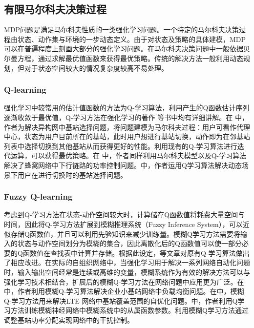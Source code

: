 ﻿\documentclass[11pt,draftclsnofoot,onecolumn,journal,letterpaper]{IEEEtran}
\begin{document}

\subsection{有限马尔科夫决策过程}
MDP问题是满足马尔科夫性质的一类强化学习问题。一个特定的马尔科夫决策过程由状态、动作集与环境的一步动态定义。由于对状态及策略的具体建模，MDP可以在普遍程度上刻画大部分的强化学习问题。在马尔科夫决策问题中一般依据贝尔曼方程，通过求解最优值函数来获得最优策略。传统的解决方法一般利用动态规划，但对于状态空间较大的情况复杂度较高不易处理。

\subsubsection{Q-learning}
强化学习中较常用的估计值函数的方法为Q-学习算法，利用产生的Q函数估计序列逐渐收敛于最优值，Q-学习方法在强化学习的著作
\cite{Sutton2016}等书中均有详细讲解。在\cite{Simsek2015} 中，作者为解决异构网中基站选择问题，将问题建模为马尔科夫过程：用户可看作代理中心，状态为用户目前所在的基站，此时用户想进行基站切换，动作即为在邻基站列表中选择切换到其他基站从而获得更好的性能。利用现有的Q-学习算法进行迭代运算，可以获得最优策略。在\cite{Ghadimi2017} 中，作者同样利用马尔科夫模型以及Q-学习算法解决了蜂窝网络中下行链路的功率控制问题。\cite{Dhahri2012}中，作者运用Q学习算法解决动态场景下用户在进行切换时的基站选择问题。

\subsubsection{Fuzzy Q-learning}
考虑到Q-学习方法在状态-动作空间较大时，计算储存Q函数值将耗费大量空间与时间，因此将Q-学习方法扩展到模糊推理系统（Fuzzy Inference System），可以近似存储Q函数值，并且可以利用先验知识来减少训练量。模糊Q学习方法需要将输入的状态与动作空间划分为模糊的集合，因此离散化后的Q函数值可以使一部分必要的Q函数值在查找表中计算并存储。根据此设定，\cite{Glorennec1997}等文章对原有Q-学习算法做出了相应改进。在实际的自组织网络中，当强化学习用于解决一系列网络自动化问题时，输入输出空间经常是连续或高维的变量，模糊系统作为有效的解决方法可以与强化学习技术相结合，扩展后的模糊Q-学习方法在网络问题中应用更为广泛。在
\cite{Munoz2013} 中，作者利用模糊Q-学习算法解决企业小基站网络中负载均衡问题。在\cite{Razavi2010}中，模糊Q-学习方法用来解决LTE 网络中基站覆盖范围的自优化问题。\cite{Fan2014}中，作者利用Q学习方法训练模糊神经网络中模糊系统中的从属函数参数。\cite{Dirani2010}利用模糊Q学习方法通过调整基站功率分配实现网络中的干扰控制。
\end{document}
